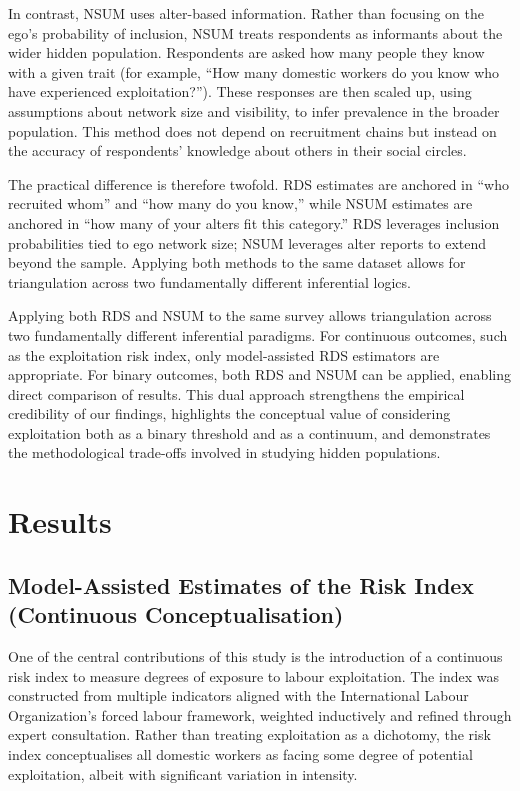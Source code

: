 \documentclass[
  12pt,
  letterpaper,
  DIV=11,
  numbers=noendperiod]{scrartcl}
\theoremstyle{plain}
\theoremstyle{definition}
\begin{document}
In contrast, NSUM uses alter-based information. Rather than focusing on
the ego's probability of inclusion, NSUM treats respondents as
informants about the wider hidden population. Respondents are asked how
many people they know with a given trait (for example, ``How many
domestic workers do you know who have experienced exploitation?'').
These responses are then scaled up, using assumptions about network size
and visibility, to infer prevalence in the broader population. This
method does not depend on recruitment chains but instead on the accuracy
of respondents' knowledge about others in their social circles.

The practical difference is therefore twofold. RDS estimates are
anchored in ``who recruited whom'' and ``how many do you know,'' while
NSUM estimates are anchored in ``how many of your alters fit this
category.'' RDS leverages inclusion probabilities tied to ego network
size; NSUM leverages alter reports to extend beyond the sample. Applying
both methods to the same dataset allows for triangulation across two
fundamentally different inferential logics.

Applying both RDS and NSUM to the same survey allows triangulation
across two fundamentally different inferential paradigms. For continuous
outcomes, such as the exploitation risk index, only model-assisted RDS
estimators are appropriate. For binary outcomes, both RDS and NSUM can
be applied, enabling direct comparison of results. This dual approach
strengthens the empirical credibility of our findings, highlights the
conceptual value of considering exploitation both as a binary threshold
and as a continuum, and demonstrates the methodological trade-offs
involved in studying hidden populations.

\section{Results}\label{results}

\subsection{Model-Assisted Estimates of the Risk Index (Continuous
Conceptualisation)}\label{model-assisted-estimates-of-the-risk-index-continuous-conceptualisation}

One of the central contributions of this study is the introduction of a
continuous risk index to measure degrees of exposure to labour
exploitation. The index was constructed from multiple indicators aligned
with the International Labour Organization's forced labour framework,
weighted inductively and refined through expert consultation. Rather
than treating exploitation as a dichotomy, the risk index conceptualises
all domestic workers as facing some degree of potential exploitation,
albeit with significant variation in intensity.
\end{document}
